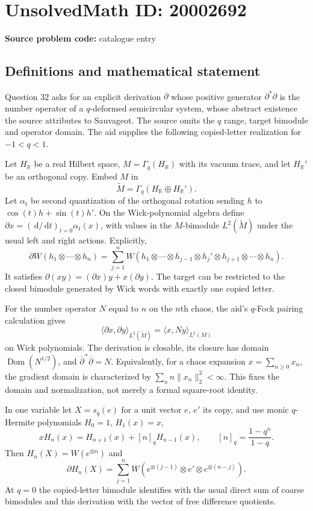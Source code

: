 \documentclass[11pt]{article}
\newcommand{\R}{\mathbb{R}}
\newcommand{\dd}{\,\mathrm{d}}
\begin{document}
\section*{UnsolvedMath ID: 20002692}
\textbf{Source problem code:} catalogue entry
\subsection{Definitions and mathematical statement}
Question 32 asks for an explicit derivation $\partial$ whose positive generator $\partial^*\partial$ is the number operator of a $q$-deformed semicircular system, whose abstract existence the source attributes to Sauvageot. The source omits the $q$ range, target bimodule and operator domain. The aid supplies the following copied-letter realization for $-1<q<1$.

Let $H_{\R}$ be a real Hilbert space, $M=\Gamma_q(H_{\R})$ with its vacuum trace, and let $H_{\R}'$ be an orthogonal copy. Embed $M$ in
\[
\widetilde M=\Gamma_q(H_{\R}\oplus H_{\R}').
\]
Let $\alpha_t$ be second quantization of the orthogonal rotation sending $h$ to $\cos(t)h+\sin(t)h'$. On the Wick-polynomial algebra define $\partial x=(\dd/\dd t)_{t=0}\alpha_t(x)$, with values in the $M$-bimodule $L^2(\widetilde M)$ under the usual left and right actions. Explicitly,
\[
\partial W(h_1\otimes\cdots\otimes h_n)
=\sum_{j=1}^nW(h_1\otimes\cdots\otimes h_{j-1}\otimes h_j'\otimes h_{j+1}\otimes\cdots\otimes h_n).
\]
It satisfies $\partial(xy)=(\partial x)y+x(\partial y)$. The target can be restricted to the closed bimodule generated by Wick words with exactly one copied letter.

For the number operator $N$ equal to $n$ on the $n$th chaos, the aid's $q$-Fock pairing calculation gives
\[
\langle\partial x,\partial y\rangle_{L^2(\widetilde M)}
=\langle x,Ny\rangle_{L^2(M)}
\]
on Wick polynomials. The derivation is closable, its closure has domain $\operatorname{Dom}(N^{1/2})$, and $\overline\partial^{\,*}\overline\partial=N$. Equivalently, for a chaos expansion $x=\sum_{n\geq0}x_n$, the gradient domain is characterized by $\sum_n n\|x_n\|_2^2<\infty$. This fixes the domain and normalization, not merely a formal square-root identity.

In one variable let $X=s_q(e)$ for a unit vector $e$, $e'$ its copy, and use monic $q$-Hermite polynomials $H_0=1$, $H_1(x)=x$,
\[
xH_n(x)=H_{n+1}(x)+[n]_qH_{n-1}(x),\qquad [n]_q=\frac{1-q^n}{1-q}.
\]
Then $H_n(X)=W(e^{\otimes n})$ and
\[
\partial H_n(X)=\sum_{j=1}^nW(e^{\otimes(j-1)}\otimes e'\otimes e^{\otimes(n-j)}).
\]
At $q=0$ the copied-letter bimodule identifies with the usual direct sum of coarse bimodules and this derivation with the vector of free difference quotients.
\end{document}
